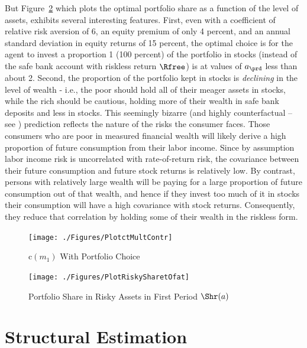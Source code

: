 \documentclass[titlepage, headings=optiontotocandhead]{econtex}
\begin{document}
But Figure~\ref{fig:PlotRiskySharetOfat} which plots the optimal portfolio share as a function of the level of assets, exhibits several interesting features.  First, even with a coefficient of relative risk aversion of 6, an equity premium of only 4 percent, and an annual standard deviation in equity returns of 15 percent, the optimal choice is for the agent to invest a proportion 1 (100 percent) of the portfolio in stocks (instead of the safe bank account with riskless return $\Rfree$) is at values of $a_{\prd}$ less than about 2.  Second, the proportion of the portfolio kept in stocks is \textit{declining} in the level of wealth - i.e., the poor should hold all of their meager assets in stocks, while the rich should be cautious, holding more of their wealth in safe bank deposits and less in stocks.  This seemingly bizarre (and highly counterfactual -- see \cite{carroll:richportfolios}) prediction reflects the nature of the risks the consumer faces.  Those consumers who are poor in measured financial wealth will likely derive a high proportion of future consumption from their labor income.  Since by assumption labor income risk is uncorrelated with rate-of-return risk, the covariance between their future consumption and future stock returns is relatively low.  By contrast, persons with relatively large wealth will be paying for a large proportion of future consumption out of that wealth, and hence if they invest too much of it in stocks their consumption will have a high covariance with stock returns.  Consequently, they reduce that correlation by holding some of their wealth in the riskless form.

\hypertarget{PlotctMultContr}{}
\begin{figure}
  \texttt{[image: ./Figures/PlotctMultContr]}
  \caption{$\mathrm{c}(m_{1})$ With Portfolio Choice}
  \label{fig:PlotctMultContr}
\end{figure}

\hypertarget{PlotRiskySharetOfat}{}
\begin{figure}
  \texttt{[image: ./Figures/PlotRiskySharetOfat]}
  \caption{Portfolio Share in Risky Assets in First Period $\Shr(a)$}
  \label{fig:PlotRiskySharetOfat}
\end{figure}

\hypertarget{structural-estimation}{}
\section{Structural Estimation}\label{sec:structural-estimation}
\end{document}

